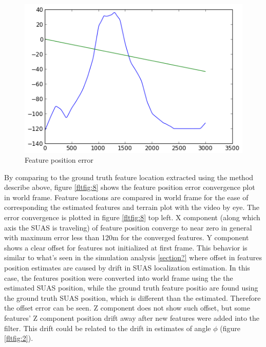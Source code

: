 \begin{figure}[h]
\centering
\includegraphics[width=12cm, keepaspectratio=true]
{./Figures/fltfig/cut1/intersect0_0.png}
\caption{Feature position error}
\label{fltfig:7}
\end{figure}

By comparing to the ground truth feature location extracted using the
method describe above, figure \ref{fltfig:8} shows the feature
position error convergence plot in world frame. Feature locations are
compared in world frame for the ease of corresponding the estimated
features and terrain plot with the video by eye. The error convergence
is plotted in figure \ref{fltfig:8} top left. X component (along which
axis the SUAS is traveling) of feature position converge to near zero
in general with maximum error less than 120m for the converged
features. Y component shows a clear offset for features not
initialized at first frame. This behavior is similar to what's seen in
the simulation analysis \ref{section?} where offset in features
position estimates are caused by drift in SUAS localization
estimation. In this case, the features position were converted into
world frame using the the estimated SUAS position, while the ground
truth feature positio are found using the ground truth SUAS position,
which is different than the estimated. Therefore the offset error can
be seen. Z component does not show such offset, but some features' Z
component position drift away after new features were added into the
filter. This drift could be related to the drift in estimates of angle
$\phi$ (figure \ref{fltfig:2}).

